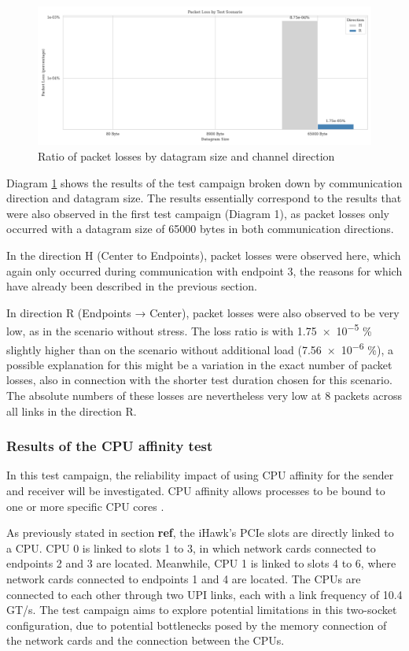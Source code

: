 \documentclass[	a4paper,
				11pt,
				DIV=11,
				bigheadings,
				idxtotoc,
				listof=totoc,	
				bibtotoc,		
				halfparskip,
				cleardoubleempty,
				oneside,
				openright]{scrartcl}
\begin{document}
\begin{figure}[h]
	\includegraphics[width=\textwidth]{fig7.png}
	\centering
	\caption{Ratio of packet losses by datagram size and channel direction}
    \label{fig:fig7}
\end{figure}

Diagram \ref{fig:fig7} shows the results of the test campaign broken down by communication direction and datagram size. The results essentially correspond to the results that were also observed in the first test campaign (Diagram 1), as packet losses only occurred with a datagram size of 65000 bytes in both communication directions.

In the direction H (Center to Endpoints), packet losses were observed here, which again only occurred during communication with endpoint 3, the reasons for which have already been described in the previous section.

In direction R (Endpoints → Center), packet losses were also observed to be very low, as in the scenario without stress. The loss ratio is with \num{1.75e-5} \% slightly higher than on the scenario without additional load (\num{7.56e-6} \%), a possible explanation for this might be a variation in the exact number of packet losses, also in connection with the shorter test duration chosen for this scenario. The absolute numbers of these losses are nevertheless very low at 8 packets across all links in the direction R.


\subsubsection{Results of the CPU affinity test}
In this test campaign, the reliability impact of using CPU affinity for the sender and receiver will be investigated. CPU affinity allows processes to be bound to one or more specific CPU cores \cite{tbd}.

As previously stated in section \textbf{ref}, the iHawk's PCIe slots are directly linked to a CPU. CPU 0 is linked to slots 1 to 3, in which network cards connected to endpoints 2 and 3 are located. Meanwhile, CPU 1 is linked to slots 4 to 6, where network cards connected to endpoints 1 and 4 are located. The CPUs are connected to each other through two UPI links, each with a link frequency of 10.4 GT/s. The test campaign aims to explore potential limitations in this two-socket configuration, due to potential bottlenecks posed by the memory connection of the network cards and the connection between the CPUs.
\end{document}
